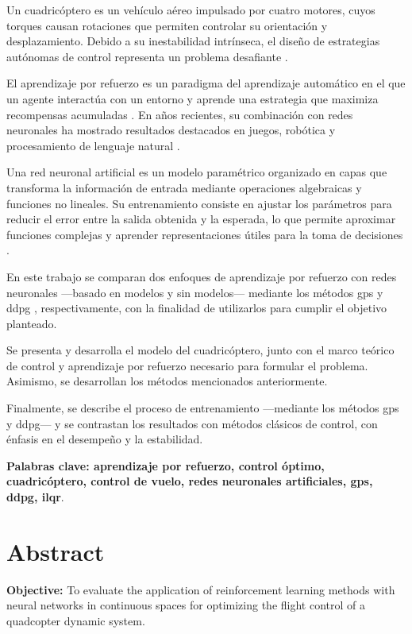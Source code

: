 \documentclass[letterpaper, 12pt, oneside]{book}
\theoremstyle{plain}
\begin{document}
Un cuadricóptero es un vehículo aéreo impulsado por cuatro motores, cuyos torques causan rotaciones que permiten controlar su orientación y desplazamiento. Debido a su inestabilidad intrínseca, el diseño de estrategias autónomas de control representa un problema desafiante \cite{fang-i2019}.

El aprendizaje por refuerzo es un paradigma del aprendizaje automático en el que un agente interactúa con un entorno y aprende una estrategia que maximiza recompensas acumuladas \cite{Sutton2000}. En años recientes, su combinación con redes neuronales ha mostrado resultados destacados en juegos, robótica y procesamiento de lenguaje natural \cite{lapan2018deep}.

Una red neuronal artificial es un modelo paramétrico organizado en capas que transforma la información de entrada mediante operaciones algebraicas y funciones no lineales. Su entrenamiento consiste en ajustar los parámetros para reducir el error entre la salida obtenida y la esperada, lo que permite aproximar funciones complejas y aprender representaciones útiles para la toma de decisiones \cite{Bishop2006, Goodfellow-et-al-2016}.

En este trabajo se comparan dos enfoques de aprendizaje por refuerzo con redes neuronales —basado en modelos y sin modelos— mediante los métodos \acrfull{gps} \cite{2014-mfcgps} y \acrfull{ddpg} \cite{lillicrap2015continuous}, respectivamente, con la finalidad de utilizarlos para cumplir el objetivo planteado.

Se presenta y desarrolla el modelo del cuadricóptero, junto con el marco teórico de control y aprendizaje por refuerzo necesario para formular el problema. Asimismo, se desarrollan los métodos mencionados anteriormente.

Finalmente, se describe el proceso de entrenamiento —mediante los métodos \acrshort{gps} y \acrshort{ddpg}— y se contrastan los resultados con métodos clásicos de control, con énfasis en el desempeño y la estabilidad.

\textbf{Palabras clave: aprendizaje por refuerzo, control óptimo, cuadricóptero, control de vuelo, redes neuronales artificiales, \acrshort{gps}, \acrshort{ddpg}, \acrshort{ilqr}}.
\newpage

\chapter*{Abstract}
\textbf{Objective:} To evaluate the application of reinforcement learning methods with neural networks in continuous spaces for optimizing the flight control of a quadcopter dynamic system.
\end{document}
